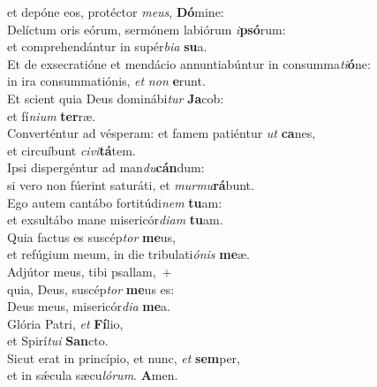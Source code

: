 \evenverse et depóne eos, protéctor \textit{me}\textit{us}, \textbf{Dó}mine:\\
\oddverse Delíctum oris eórum, sermónem labiórum \textit{i}\textbf{psó}rum:~\*\\
\oddverse et comprehendántur in supér\textit{bi}\textit{a} \textbf{su}a.\\
\evenverse Et de exsecratióne et mendácio annuntiabúntur in consumma\textit{ti}\textbf{ó}ne:~\*\\
\evenverse in ira consummatiónis, \textit{et} \textit{non} \textbf{e}runt.\\
\oddverse Et scient quia Deus dominábi\textit{tur} \textbf{Ja}cob:~\*\\
\oddverse et fí\textit{ni}\textit{um} \textbf{ter}ræ.\\
\evenverse Converténtur ad vésperam: et famem patiéntur \textit{ut} \textbf{ca}nes,~\*\\
\evenverse et circuíbunt \textit{ci}\textit{vi}\textbf{tá}tem.\\
\oddverse Ipsi dispergéntur ad man\textit{du}\textbf{cán}dum:~\*\\
\oddverse si vero non fúerint saturáti, et \textit{mur}\textit{mu}\textbf{rá}bunt.\\
\evenverse Ego autem cantábo fortitúdi\textit{nem} \textbf{tu}am:~\*\\
\evenverse et exsultábo mane misericór\textit{di}\textit{am} \textbf{tu}am.\\
\oddverse Quia factus es suscép\textit{tor} \textbf{me}us,~\*\\
\oddverse et refúgium meum, in die tribulati\textit{ó}\textit{nis} \textbf{me}æ.\\
\evenverse Adjútor meus, tibi psallam,~+\\
\evenverse  quia, Deus, suscép\textit{tor} \textbf{me}us es:~\*\\
\evenverse Deus meus, misericór\textit{di}\textit{a} \textbf{me}a.\\
\oddverse Glória Patri, \textit{et} \textbf{Fí}lio,~\*\\
\oddverse et Spirí\textit{tu}\textit{i} \textbf{San}cto.\\
\evenverse Sicut erat in princípio, et nunc, \textit{et} \textbf{sem}per,~\*\\
\evenverse et in sǽcula sæcu\textit{ló}\textit{rum}. \textbf{A}men.\\

